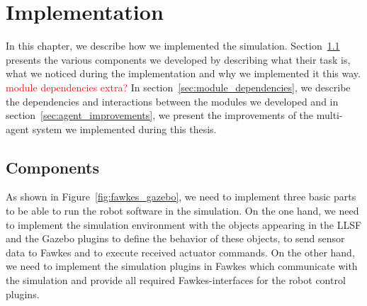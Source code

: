 \chapter{Implementation}
\label{cha:implementation}
In this chapter, we describe how we implemented the simulation. Section~\ref{sec:components} presents the various components we developed by describing what their task is, what we noticed during the implementation and why we implemented it this way. \textcolor{red}{module dependencies extra?} In section~\ref{sec:module_dependencies}, we describe the dependencies and interactions between the modules we developed and in section~\ref{sec:agent_improvements}, we present the improvements of the multi-agent system we implemented during this thesis.

\section{Components}
\label{sec:components}
As shown in Figure~\ref{fig:fawkes_gazebo}, we need to implement three basic parts to be able to run the robot software in the simulation. On the one hand, we need to implement the simulation environment with the objects appearing in the LLSF and the Gazebo plugins to define the behavior of these objects, to send sensor data to Fawkes and to execute received actuator commands. On the other hand, we need to implement the simulation plugins in Fawkes which communicate with the simulation and provide all required Fawkes-interfaces for the robot control plugins.

